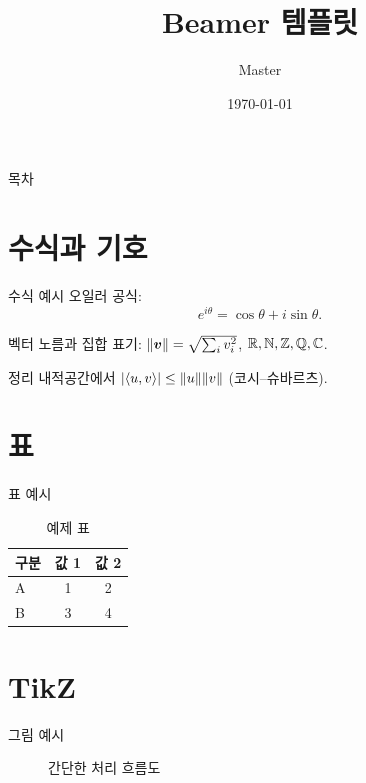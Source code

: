 \documentclass{beamer}
\title{Beamer 템플릿}
\author{Master}
\date{\today}
\begin{document}
\begin{frame}
  \titlepage
\end{frame}

\begin{frame}{목차}
  \tableofcontents
\end{frame}

\section{수식과 기호}

\begin{frame}{수식 예시}
  오일러 공식:
  \[
    e^{i\theta} = \cos\theta + i\sin\theta.
  \]

  \pause
  벡터 노름과 집합 표기: $\lVert\bm{v}\rVert = \sqrt{\sum_i v_i^2}$,
  \quad $\mathbb{R}, \mathbb{N}, \mathbb{Z}, \mathbb{Q}, \mathbb{C}$.

  \pause
  \begin{block}{정리}
    내적공간에서 $\lvert\langle u,v\rangle\rvert \le \lVert u\rVert\lVert v\rVert$ (코시--슈바르츠).
  \end{block}
\end{frame}

\section{표}

\begin{frame}{표 예시}
  \begin{table}
    \centering
    \begin{tabular}{lcc}
      \toprule
      구분 & 값 1 & 값 2 \\
      \midrule
      A & 1 & 2 \\
      B & 3 & 4 \\
      \bottomrule
    \end{tabular}
    \caption{예제 표}
  \end{table}
\end{frame}

\section{TikZ}

\begin{frame}{그림 예시}
  \begin{figure}
    \centering
    \caption{간단한 처리 흐름도}
  \end{figure}
\end{frame}
\end{document}
